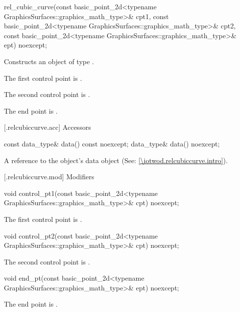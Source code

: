 %
\begin{itemdecl}
rel_cubic_curve(const basic_point_2d<typename GraphicsSurfaces::graphics_math_type>& cpt1,
  const basic_point_2d<typename GraphicsSurfaces::graphics_math_type>& cpt2,
  const basic_point_2d<typename GraphicsSurfaces::graphics_math_type>& ept) noexcept;
\end{itemdecl}
\begin{itemdescr}
\pnum
\effects Constructs an object of type .

\pnum
\remarks The first control point is .

\pnum
\remarks The second control point is .

\pnum
\remarks The end point is .
\end{itemdescr}

 [\iotwod.relcubiccurve.acc] {Accessors}%

%
\begin{itemdecl}
const data_type& data() const noexcept;
data_type& data() noexcept;
\end{itemdecl}
\begin{itemdescr}
\pnum
\returns A reference to the  object's data object (See: \ref{\iotwod.relcubiccurve.intro}).
\end{itemdescr}

 [\iotwod.relcubiccurve.mod] {Modifiers}

%
\begin{itemdecl}
void control_pt1(const basic_point_2d<typename
  GraphicsSurfaces::graphics_math_type>& cpt) noexcept;
\end{itemdecl}
\begin{itemdescr}
\pnum
\effects
The first control point is .
\end{itemdescr}

%
\begin{itemdecl}
void control_pt2(const basic_point_2d<typename
  GraphicsSurfaces::graphics_math_type>& cpt) noexcept;
\end{itemdecl}
\begin{itemdescr}
\pnum
\effects
The second control point is .
\end{itemdescr}

%
\begin{itemdecl}
void end_pt(const basic_point_2d<typename GraphicsSurfaces::graphics_math_type>& ept) noexcept;
\end{itemdecl}
\begin{itemdescr}
\pnum
\effects
The end point is .
\end{itemdescr}

